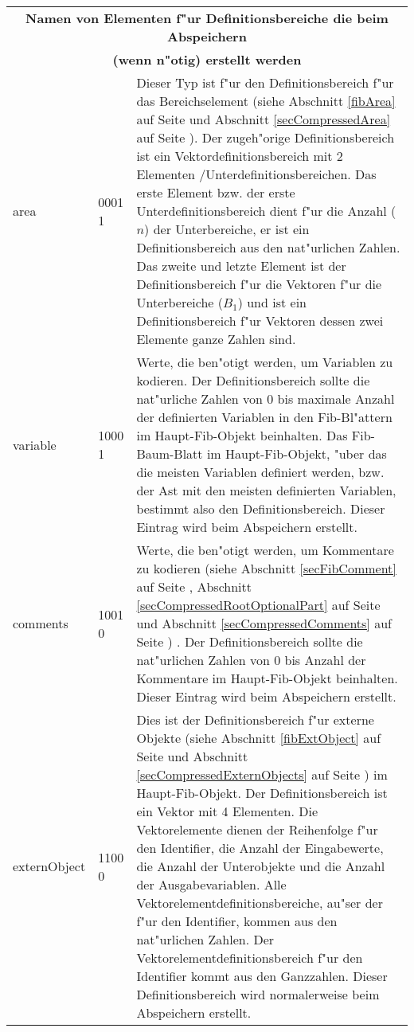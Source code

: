 \begin{center}
\begin{longtable}{|p{25mm}|p{15mm}|p{85mm}|}
	\multicolumn{3}{|c|}{\textbf{Namen von Elementen f"ur Definitionsbereiche die beim Abspeichern}}\\
	\multicolumn{3}{|c|}{\textbf{(wenn n"otig) erstellt werden}}\\\hline

	area & 0001 1 & Dieser Typ ist f"ur den Definitionsbereich f"ur das Bereichselement (siehe Abschnitt \ref{fibArea} auf Seite \pageref{fibArea} und Abschnitt \ref{secCompressedArea} auf Seite \pageref{secCompressedArea}). Der zugeh"orige Definitionsbereich ist ein Vektordefinitionsbereich mit 2 Elementen /Unterdefinitionsbereichen. Das erste Element bzw. der erste Unterdefinitionsbereich dient f"ur die Anzahl ($n$) der Unterbereiche, er ist ein Definitionsbereich aus den nat"urlichen Zahlen. Das zweite und letzte Element ist der Definitionsbereich f"ur die Vektoren f"ur die Unterbereiche ($B_{1}$) und ist ein Definitionsbereich f"ur Vektoren dessen zwei Elemente ganze Zahlen sind. \\\hline
	variable & 1000 1 & Werte, die ben"otigt werden, um Variablen zu kodieren. Der Definitionsbereich sollte die nat"urliche Zahlen von 0 bis maximale Anzahl der definierten Variablen in den Fib-Bl"attern im Haupt-Fib-Objekt beinhalten. Das Fib-Baum-Blatt im Haupt-Fib-Objekt, "uber das die meisten Variablen definiert werden, bzw. der Ast mit den meisten definierten Variablen, bestimmt also den Definitionsbereich. Dieser Eintrag wird beim Abspeichern erstellt.\\\hline
	comments & 1001 0 & Werte, die ben"otigt werden, um Kommentare zu kodieren (siehe Abschnitt \ref{secFibComment} auf Seite \pageref{secFibComment}, Abschnitt \ref{secCompressedRootOptionalPart} auf Seite \pageref{secCompressedRootOptionalPart} und Abschnitt \ref{secCompressedComments} auf Seite \pageref{secCompressedComments}) . Der Definitionsbereich sollte die nat"urlichen Zahlen von 0 bis Anzahl der Kommentare im Haupt-Fib-Objekt beinhalten. Dieser Eintrag wird beim Abspeichern erstellt.\\\hline
	externObject & 1100 0 & Dies ist der Definitionsbereich f"ur externe Objekte (siehe Abschnitt \ref{fibExtObject} auf Seite \pageref{fibExtObject} und Abschnitt \ref{secCompressedExternObjects} auf Seite \pageref{secCompressedExternObjects}) im Haupt-Fib-Objekt. Der Definitionsbereich ist ein Vektor mit 4 Elementen. Die Vektorelemente dienen der Reihenfolge f"ur den Identifier, die Anzahl der Eingabewerte, die Anzahl der Unterobjekte und die Anzahl der Ausgabevariablen. Alle Vektorelementdefinitionsbereiche, au"ser der f"ur den Identifier, kommen aus den nat"urlichen Zahlen. Der Vektorelementdefinitionsbereich f"ur den Identifier kommt aus den Ganzzahlen. Dieser Definitionsbereich wird normalerweise beim Abspeichern erstellt.\\\hline

\end{longtable}
\end{center}
